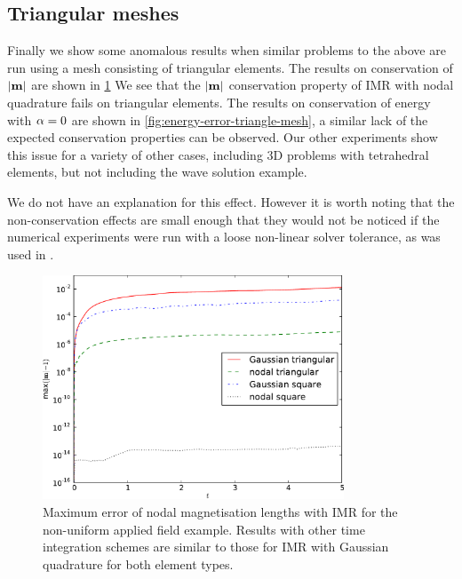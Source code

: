 \subsection{Triangular meshes}

Finally we show some anomalous results when similar problems to the above are run using a mesh consisting of triangular elements.
The results on conservation of $\left|{\boldsymbol{\mathrm{m}}} \right|$ are shown in \cref{fig:ml-error-triangle-mesh}
We see that the $\left|{\boldsymbol{\mathrm{m}}} \right|$ conservation property of IMR with nodal quadrature fails on triangular elements.
The results on conservation of energy with $\alpha = 0$ are shown in \cref{fig:energy-error-triangle-mesh}, a similar lack of the expected conservation properties can be observed.
Our other experiments show this issue for a variety of other cases, including 3D problems with tetrahedral elements, but not including the wave solution example.

We do not have an explanation for this effect.
However it is worth noting that the non-conservation effects are small enough that they would not be noticed if the numerical experiments were run with a loose non-linear solver tolerance, as was used in \eg \cite{Bartels2006}.

\begin{figure}
  \centering
  \includegraphics[width=0.8\textwidth]
  {plots/nonuniform-h-triangles-ml/mlengtherrormaxesvstimes.pdf}
  \caption{Maximum error of nodal magnetisation lengths with IMR for the non-uniform applied field example.
Results with other time integration schemes are similar to those for IMR with Gaussian quadrature for both element types.}
  \label{fig:ml-error-triangle-mesh}
\end{figure}

